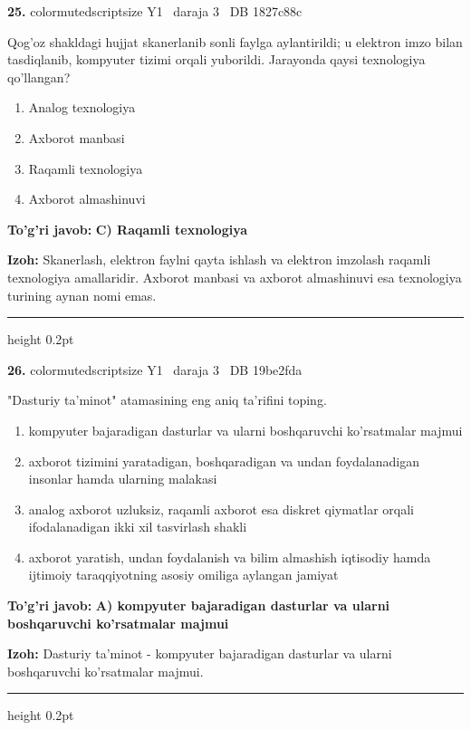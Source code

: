 \documentclass[10pt,a4paper,oneside]{article}
\begin{document}
\noindent\textbf{\color{ink}25.}  {color{muted}scriptsize Y1 \textbullet\ daraja 3 \textbullet\ DB 1827c88c}
\par
Qog'oz shakldagi hujjat skanerlanib sonli faylga aylantirildi; u elektron imzo bilan tasdiqlanib, kompyuter tizimi orqali yuborildi. Jarayonda qaysi texnologiya qo'llangan?
\begin{enumerate}[label=\Alph*),leftmargin=9mm]
\item Analog texnologiya
\item Axborot manbasi
\item Raqamli texnologiya
\item Axborot almashinuvi
\end{enumerate}
\begin{tcolorbox}[enhanced,breakable,colback=teal!4,colframe=teal!50!black,boxrule=0.5pt,arc=1.1mm,left=3mm,right=3mm,top=1.7mm,bottom=1.7mm,before skip=2mm,after skip=2mm]
\textbf{\color{teal}To'g'ri javob:} \textbf{C) Raqamli texnologiya}
\par\smallskip
\textbf{Izoh:} Skanerlash, elektron faylni qayta ishlash va elektron imzolash raqamli texnologiya amallaridir. Axborot manbasi va axborot almashinuvi esa texnologiya turining aynan nomi emas.
\end{tcolorbox}
\vspace{2mm}\hrule height 0.2pt \vspace{3mm}

\noindent\textbf{\color{ink}26.}  {color{muted}scriptsize Y1 \textbullet\ daraja 3 \textbullet\ DB 19be2fda}
\par
"Dasturiy ta'minot" atamasining eng aniq ta'rifini toping.
\begin{enumerate}[label=\Alph*),leftmargin=9mm]
\item kompyuter bajaradigan dasturlar va ularni boshqaruvchi ko'rsatmalar majmui
\item axborot tizimini yaratadigan, boshqaradigan va undan foydalanadigan insonlar hamda ularning malakasi
\item analog axborot uzluksiz, raqamli axborot esa diskret qiymatlar orqali ifodalanadigan ikki xil tasvirlash shakli
\item axborot yaratish, undan foydalanish va bilim almashish iqtisodiy hamda ijtimoiy taraqqiyotning asosiy omiliga aylangan jamiyat
\end{enumerate}
\begin{tcolorbox}[enhanced,breakable,colback=teal!4,colframe=teal!50!black,boxrule=0.5pt,arc=1.1mm,left=3mm,right=3mm,top=1.7mm,bottom=1.7mm,before skip=2mm,after skip=2mm]
\textbf{\color{teal}To'g'ri javob:} \textbf{A) kompyuter bajaradigan dasturlar va ularni boshqaruvchi ko'rsatmalar majmui}
\par\smallskip
\textbf{Izoh:} Dasturiy ta'minot - kompyuter bajaradigan dasturlar va ularni boshqaruvchi ko'rsatmalar majmui.
\end{tcolorbox}
\vspace{2mm}\hrule height 0.2pt \vspace{3mm}
\end{document}
